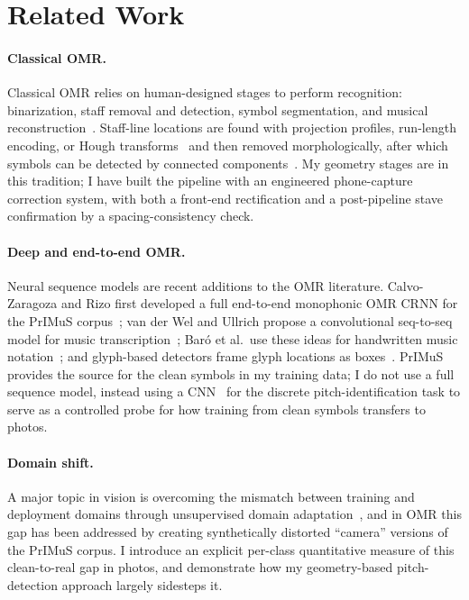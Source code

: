 \section{Related Work}
\label{sec:related}

\paragraph{Classical OMR.}
Classical OMR relies on human-designed stages to perform recognition:
binarization, staff removal and detection, symbol segmentation, and musical
reconstruction~\cite{rebelo2012state,calvo2020understanding}. Staff-line
locations are found with projection profiles, run-length encoding, or Hough
transforms~\cite{duda1972hough} and then removed morphologically, after which
symbols can be detected by connected components~\cite{suzuki1985contours}. My
geometry stages are in this tradition; I have built the pipeline with an
engineered phone-capture correction system, with both a front-end rectification
and a post-pipeline stave confirmation by a spacing-consistency check.

\paragraph{Deep and end-to-end OMR.}
Neural sequence models are recent additions to the OMR literature. Calvo-Zaragoza
and Rizo first developed a full end-to-end monophonic OMR CRNN for the PrIMuS
corpus~\cite{calvo2018primus}; van der Wel and Ullrich propose a convolutional
seq-to-seq model for music transcription~\cite{vanderwel2017seq2seq}; Bar\'o et
al.\ use these ideas for handwritten music notation~\cite{baro2019handwritten};
and glyph-based detectors frame glyph locations as boxes~\cite{pacha2018baseline}.
PrIMuS provides the source for the clean symbols in my training data; I do not
use a full sequence model, instead using a CNN~\cite{lecun1998gradient} for the
discrete pitch-identification task to serve as a controlled probe for how
training from clean symbols transfers to photos.

\paragraph{Domain shift.}
A major topic in vision is overcoming the mismatch between training and
deployment domains through unsupervised domain adaptation~\cite{ganin2015dann},
and in OMR this gap has been addressed by creating synthetically distorted
``camera'' versions of the PrIMuS corpus. I introduce an explicit per-class
quantitative measure of this clean-to-real gap in photos, and demonstrate how my
geometry-based pitch-detection approach largely sidesteps it.
